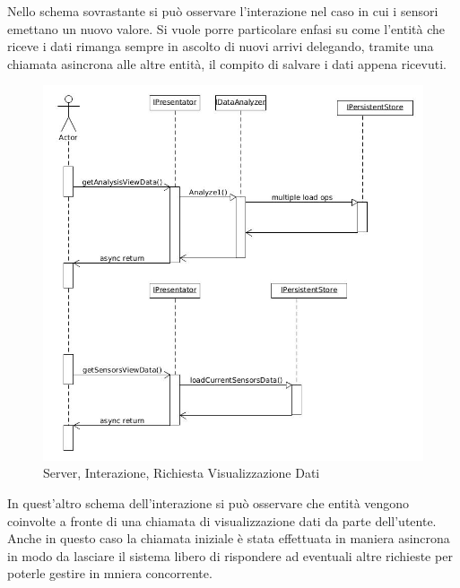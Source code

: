 Nello schema sovrastante si pu\`o osservare l'interazione nel caso in cui i sensori emettano un nuovo valore. Si vuole porre particolare enfasi su come l'entit\`a che riceve i dati rimanga sempre in ascolto di nuovi arrivi delegando, tramite una chiamata asincrona alle altre entit\`a, il compito di salvare i dati appena ricevuti.

\newpage

\begin{figure}[h]
\centering
\includegraphics[scale=0.4]{Figures/DomainModel/Server/GetOperationInteraction}
\caption{Server, Interazione, Richiesta Visualizzazione Dati}
\end{figure}

In quest'altro schema dell'interazione si pu\`o osservare che entit\`a vengono coinvolte a fronte di una chiamata di visualizzazione dati da parte dell'utente. Anche in questo caso la chiamata iniziale \`e stata effettuata in maniera asincrona in modo da lasciare il sistema libero di rispondere ad eventuali altre richieste per poterle gestire in mniera concorrente.

\newpage

